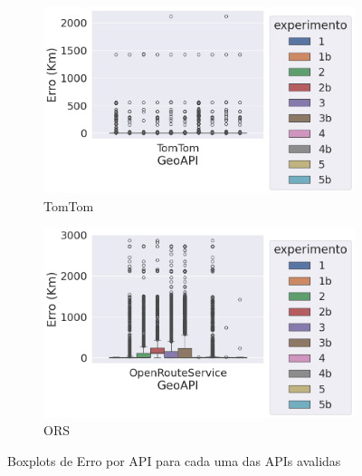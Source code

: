 \begin{figure}[ht]
  \begin{subfigure}[b]{0.45\textwidth}
    \includegraphics[width=\textwidth]{Figuras/boxplotApiTomtom.png}
    \caption{TomTom}
    \label{fig:boxplot-api-tomtom}
  \end{subfigure}
  \hfill
  \begin{subfigure}[b]{0.45\textwidth}
    \includegraphics[width=\textwidth]{Figuras/boxplotApiOrs.png}
    \caption{ORS}
    \label{fig:boxplot-api-ors}
  \end{subfigure}
  
  \caption{Boxplots de Erro por API para cada uma das APIs avalidas}
  \label{fig:boxplot-api-global-bh}
\end{figure}

